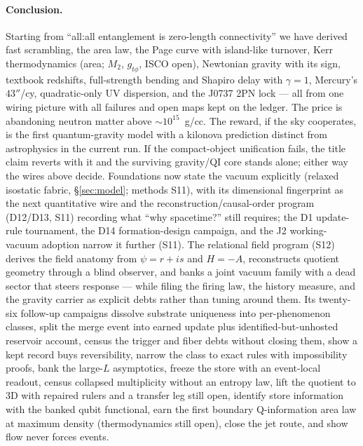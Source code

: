 \documentclass[11pt]{article}
\begin{document}
\paragraph{Conclusion.}
Starting from ``all:all entanglement is zero-length connectivity'' we have
derived fast scrambling, the area law, the Page curve with island-like turnover, Kerr
thermodynamics (area; $M_2$, $g_{t\phi}$, ISCO open), Newtonian gravity with its sign, textbook redshifts,
full-strength bending and Shapiro delay with $\gamma = 1$, Mercury's
$43''$/cy, quadratic-only UV dispersion, and the J0737 2PN lock --- all from
one wiring picture with all failures and open maps kept on the ledger. The
price is abandoning neutron matter above $\sim 10^{15}$~g/cc. The reward, if
the sky cooperates, is the first quantum-gravity model with a kilonova
prediction distinct from astrophysics in the current run. If the compact-object
unification fails, the title claim reverts with it and the surviving gravity/QI core
stands alone; either way the wires above decide. Foundations now state the vacuum
explicitly (relaxed isostatic fabric, \S\ref{sec:model}; methods S11), with its
dimensional fingerprint as the next quantitative wire and the
reconstruction/causal-order program (D12/D13, S11) recording what
``why spacetime?'' still requires; the D1 update-rule tournament, the D14
formation-design campaign, and the J2 working-vacuum adoption narrow it
further (S11). The relational field program (S12) derives the field
anatomy from $\psi = r+is$ and $H = -A$, reconstructs quotient geometry
through a blind observer, and banks a joint vacuum family with a dead
sector that steers response --- while filing the firing law, the history
measure, and the gravity carrier as explicit debts rather than tuning
around them. Its twenty-six follow-up campaigns dissolve substrate uniqueness
into per-phenomenon classes, split the merge event into earned update plus
identified-but-unhosted reservoir account, census the trigger and fiber
debts without closing them, show a kept record buys reversibility, narrow
the class to exact rules with impossibility proofs, bank the large-$L$
asymptotics, freeze the store with an event-local readout, census collapsed
multiplicity without an entropy law, lift
the quotient to 3D with repaired rulers and a transfer leg still open,
identify store information with the banked qubit functional, earn the
first boundary Q-information area law at maximum density (thermodynamics
still open), close the jet route, and show flow never forces events.
\end{document}
